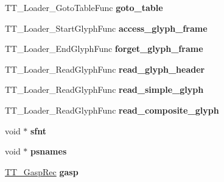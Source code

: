 \begin{DoxyCompactItemize}
\item 
\hypertarget{struct_t_t___face_rec___a3e2e3599abb7737179dbb2fbbd15355d}{T\-T\-\_\-\-Loader\-\_\-\-Goto\-Table\-Func {\bfseries goto\-\_\-table}}\label{struct_t_t___face_rec___a3e2e3599abb7737179dbb2fbbd15355d}

\item 
\hypertarget{struct_t_t___face_rec___a67cce5f4da277e6c8a47d8efe95bc58c}{T\-T\-\_\-\-Loader\-\_\-\-Start\-Glyph\-Func {\bfseries access\-\_\-glyph\-\_\-frame}}\label{struct_t_t___face_rec___a67cce5f4da277e6c8a47d8efe95bc58c}

\item 
\hypertarget{struct_t_t___face_rec___ac86fbd960fe6c919eb82cd7233655894}{T\-T\-\_\-\-Loader\-\_\-\-End\-Glyph\-Func {\bfseries forget\-\_\-glyph\-\_\-frame}}\label{struct_t_t___face_rec___ac86fbd960fe6c919eb82cd7233655894}

\item 
\hypertarget{struct_t_t___face_rec___a343db3c51a3047324fea455ac06d7cb3}{T\-T\-\_\-\-Loader\-\_\-\-Read\-Glyph\-Func {\bfseries read\-\_\-glyph\-\_\-header}}\label{struct_t_t___face_rec___a343db3c51a3047324fea455ac06d7cb3}

\item 
\hypertarget{struct_t_t___face_rec___aa9f550ad4e10d8232cdd3427e02e7603}{T\-T\-\_\-\-Loader\-\_\-\-Read\-Glyph\-Func {\bfseries read\-\_\-simple\-\_\-glyph}}\label{struct_t_t___face_rec___aa9f550ad4e10d8232cdd3427e02e7603}

\item 
\hypertarget{struct_t_t___face_rec___ac261cd70ce36c35c615fc5e2319b40c4}{T\-T\-\_\-\-Loader\-\_\-\-Read\-Glyph\-Func {\bfseries read\-\_\-composite\-\_\-glyph}}\label{struct_t_t___face_rec___ac261cd70ce36c35c615fc5e2319b40c4}

\item 
\hypertarget{struct_t_t___face_rec___a4c198db893da1900ee0384969d10f9f6}{void $\ast$ {\bfseries sfnt}}\label{struct_t_t___face_rec___a4c198db893da1900ee0384969d10f9f6}

\item 
\hypertarget{struct_t_t___face_rec___a68cd8f2554793512af611422092b4814}{void $\ast$ {\bfseries psnames}}\label{struct_t_t___face_rec___a68cd8f2554793512af611422092b4814}

\item 
\hypertarget{struct_t_t___face_rec___a042468253b53931f4901ac47e37fbe14}{\hyperlink{struct_t_t___gasp__}{T\-T\-\_\-\-Gasp\-Rec} {\bfseries gasp}}\label{struct_t_t___face_rec___a042468253b53931f4901ac47e37fbe14}


\end{DoxyCompactItemize}
